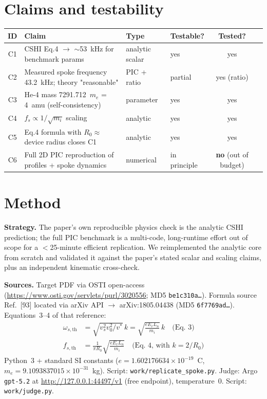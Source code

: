 \documentclass[11pt]{article}
\begin{document}
\section{Claims and testability}
\begin{table}[h]
\centering\small
\begin{tabular}{@{}clllcc@{}}
\toprule
ID & Claim & Type & Testable? & Tested? \\
\midrule
C1 & CSHI Eq.4 $\to$ $\sim$53~kHz for benchmark params & analytic scalar & yes & yes \\
C2 & Measured spoke frequency 43.2~kHz; theory "reasonable" & PIC + ratio & partial & yes (ratio) \\
C3 & He-4 mass 7291.712~$m_e$ = 4~amu (self-consistency) & parameter & yes & yes \\
C4 & $f_s \propto 1/\sqrt{m_i}$ scaling & analytic & yes & yes \\
C5 & Eq.4 formula with $R_0 \approx$ device radius closes C1 & analytic & yes & yes \\
C6 & Full 2D PIC reproduction of profiles + spoke dynamics & numerical & in principle & \textbf{no} (out of budget) \\
\bottomrule
\end{tabular}
\end{table}

\section{Method}
\textbf{Strategy.} The paper's own reproducible physics check is the analytic
CSHI prediction; the full PIC benchmark is a multi-code, long-runtime effort
out of scope for a $<$25-minute efficient replication. We reimplemented the
analytic core from scratch and validated it against the paper's stated scalar
and scaling claims, plus an independent kinematic cross-check.

\textbf{Sources.} Target PDF via OSTI open-access
(\url{https://www.osti.gov/servlets/purl/3020556}; MD5 \texttt{be1c310a\ldots}).
Formula source Ref.~[93] located via arXiv API $\to$ arXiv:1805.04438 (MD5
\texttt{6f7769ad\ldots}). Equations~3--4 of that reference:
\begin{align}
\omega_{s,\text{th}} &= \sqrt{v_s^2 v_0^2 / v^{*}}\,k
 = \sqrt{\frac{e E_r L_n}{m_i}}\,k
 \quad\text{(Eq.\ 3)} \\
f_{s,\text{th}} &= \frac{1}{\pi R_0}\sqrt{\frac{e E_r L_n}{m_i}}
 \quad\text{(Eq.\ 4, with } k = 2/R_0\text{)}
\end{align}
Python~3 + standard SI constants ($e = 1.602176634 \times 10^{-19}$~C,
$m_e = 9.1093837015 \times 10^{-31}$~kg). Script:
\texttt{work/replicate\_spoke.py}. Judge: Argo \texttt{gpt-5.2} at
\url{http://127.0.0.1:44497/v1} (free endpoint), temperature~0. Script:
\texttt{work/judge.py}.
\end{document}
